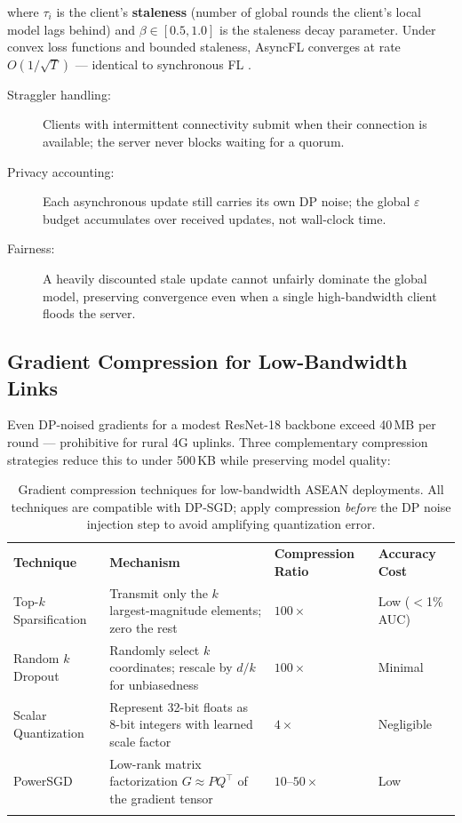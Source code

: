 where $\tau_i$ is the client's \textbf{staleness} (number of global rounds the client's local model lags behind) and $\beta \in [0.5, 1.0]$ is the staleness decay parameter. Under convex loss functions and bounded staleness, AsyncFL converges at rate $O(1/\sqrt{T})$ — identical to synchronous FL \cite{xie2019}.

\begin{description}
  \item[Straggler handling:] Clients with intermittent connectivity submit when their connection is available; the server never blocks waiting for a quorum.
  \item[Privacy accounting:] Each asynchronous update still carries its own DP noise; the global $\varepsilon$ budget accumulates over received updates, not wall-clock time.
  \item[Fairness:] A heavily discounted stale update cannot unfairly dominate the global model, preserving convergence even when a single high-bandwidth client floods the server.
\end{description}

\subsection{Gradient Compression for Low-Bandwidth Links}
\label{subsec:gradient_compression}

Even DP-noised gradients for a modest ResNet-18 backbone exceed 40\,MB per round --- prohibitive for rural 4G uplinks. Three complementary compression strategies reduce this to under 500\,KB while preserving model quality:

\begin{table}[ht]
\centering
\caption{Gradient compression techniques for low-bandwidth ASEAN deployments. All techniques are compatible with DP-SGD; apply compression \emph{before} the DP noise injection step to avoid amplifying quantization error.}
\label{tab:gradient_compression}
\renewcommand{\arraystretch}{1.2}
\begin{tabular}{p{3.2cm} p{4.0cm} p{2.0cm} p{2.4cm}}
\hline\noalign{\smallskip}
\textbf{Technique} & \textbf{Mechanism} & \textbf{Compression Ratio} & \textbf{Accuracy Cost} \\
\noalign{\smallskip}\svhline\noalign{\smallskip}
Top-$k$ Sparsification & Transmit only the $k$ largest-magnitude elements; zero the rest & $100\times$ & Low ($<$1\% AUC) \\[3pt]
Random $k$ Dropout & Randomly select $k$ coordinates; rescale by $d/k$ for unbiasedness & $100\times$ & Minimal \\[3pt]
Scalar Quantization & Represent 32-bit floats as 8-bit integers with learned scale factor & $4\times$ & Negligible \\[3pt]
PowerSGD & Low-rank matrix factorization $G \approx PQ^\top$ of the gradient tensor & $10$--$50\times$ & Low \\
\noalign{\smallskip}\hline\noalign{\smallskip}
\end{tabular}
\end{table}

